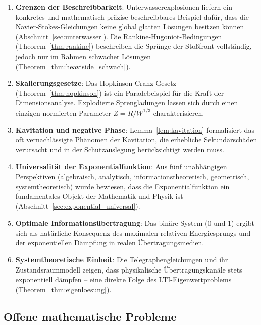 ﻿\documentclass[12pt,a4paper]{article}
\theoremstyle{definition}
\theoremstyle{remark}
\begin{document}
\begin{enumerate}[leftmargin=*, label=\textbf{(\theenumi)}]
\item \textbf{Grenzen der Beschreibbarkeit}: Unterwasserexplosionen liefern ein konkretes und mathematisch präzise beschreibbares Beispiel dafür, dass die Navier-Stokes-Gleichungen keine global glatten Lösungen besitzen können (Abschnitt~\ref{sec:unterwasser}). Die Rankine-Hugoniot-Bedingungen (Theorem~\ref{thm:rankine}) beschreiben die Sprünge der Stoßfront vollständig, jedoch nur im Rahmen schwacher Lösungen (Theorem~\ref{thm:heaviside_schwach}).

\item \textbf{Skalierungsgesetze}: Das Hopkinson-Cranz-Gesetz (Theorem~\ref{thm:hopkinson}) ist ein Paradebeispiel für die Kraft der Dimensionsanalyse. Explodierte Sprengladungen lassen sich durch einen einzigen normierten Parameter $Z = R/W^{1/3}$ charakterisieren.

\item \textbf{Kavitation und negative Phase}: Lemma~\ref{lem:kavitation} formalisiert das oft vernachlässigte Phänomen der Kavitation, die erhebliche Sekundärschäden verursacht und in der Schutzauslegung berücksichtigt werden muss.

\item \textbf{Universalität der Exponentialfunktion}: Aus fünf unabhängigen Perspektiven (algebraisch, analytisch, informationstheoretisch, geometrisch, systemtheoretisch) wurde bewiesen, dass die Exponentialfunktion ein fundamentales Objekt der Mathematik und Physik ist (Abschnitt~\ref{sec:exponential_universal}).

\item \textbf{Optimale Informationsübertragung}: Das binäre System (0 und 1) ergibt sich als natürliche Konsequenz des maximalen relativen Energiesprungs und der exponentiellen Dämpfung in realen Übertragungsmedien.

\item \textbf{Systemtheoretische Einheit}: Die Telegraphengleichungen und ihr Zustandsraummodell zeigen, dass physikalische Übertragungskanäle stets exponentiell dämpfen -- eine direkte Folge des LTI-Eigenwertproblems (Theorem~\ref{thm:eigenloesung}).
\end{enumerate}

\subsection{Offene mathematische Probleme}
\end{document}
